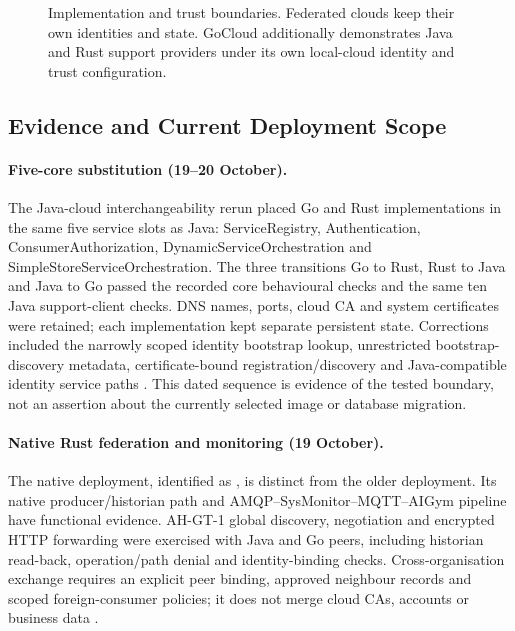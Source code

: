\documentclass[a4paper]{arrowhead}
\begin{document}
\begin{figure}[htbp]
\centering

\caption{Implementation and trust boundaries. Federated clouds keep their own
identities and state. GoCloud additionally demonstrates Java and Rust support
providers under its own local-cloud identity and trust configuration.}
\label{fig:implementation-interop}
\end{figure}
\FloatBarrier

\subsection{Evidence and Current Deployment Scope}
\paragraph{Five-core substitution (19--20 October).}
The Java-cloud interchangeability rerun placed Go and Rust implementations in the
same five service slots as Java: ServiceRegistry, Authentication,
ConsumerAuthorization, DynamicServiceOrchestration and SimpleStoreServiceOrchestration.
The three transitions Go to Rust, Rust to Java and Java to Go passed the recorded
core behavioural checks and the same ten Java support-client checks. DNS names,
ports, cloud CA and system certificates were retained; each implementation kept
separate persistent state. Corrections included the narrowly scoped identity
bootstrap lookup, unrestricted bootstrap-discovery metadata, certificate-bound
registration/discovery and Java-compatible identity service paths
\cite{coreSwaps20261020}. This dated sequence is evidence of the tested boundary,
not an assertion about the currently selected image or database migration.

\paragraph{Native Rust federation and monitoring (19 October).}
The native  deployment, identified as
, is distinct from the older
 deployment. Its native producer/historian
path and AMQP--SysMonitor--MQTT--AIGym pipeline have functional evidence.
AH-GT-1 global discovery, negotiation and encrypted HTTP forwarding were exercised
with Java and Go peers, including historian read-back, operation/path denial and
identity-binding checks. Cross-organisation exchange requires an explicit
 peer binding, approved neighbour records and scoped
foreign-consumer policies; it does not merge cloud CAs, accounts or business data
\cite{rustFederation20261019}.
\end{document}
